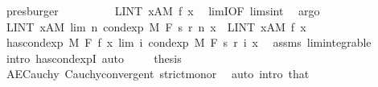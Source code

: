 \begin{isabellebody}
\ presburger\isanewline
\ \ \ \ \isamarkupfalse%
\ \isamarkupfalse%
\ {\isachardoublequoteopen}{\isachardot}{\kern0pt}{\isachardot}{\kern0pt}{\isachardot}{\kern0pt}\ {\isacharequal}{\kern0pt}\ LINT\ x{\isacharcolon}{\kern0pt}A{\isacharbar}{\kern0pt}M{\isachardot}{\kern0pt}\ f\ x{\isachardoublequoteclose}\ \isamarkupfalse%
\ limI{\isacharbrackleft}{\kern0pt}OF\ lim{\isacharunderscore}{\kern0pt}s{\isacharunderscore}{\kern0pt}int{\isacharbrackright}{\kern0pt}\ \isamarkupfalse%
\ argo\isanewline
\ \ \ \ \isamarkupfalse%
\ \isamarkupfalse%
\ {\isachardoublequoteopen}LINT\ x{\isacharcolon}{\kern0pt}A{\isacharbar}{\kern0pt}M{\isachardot}{\kern0pt}\ lim\ {\isacharparenleft}{\kern0pt}{\isasymlambda}n{\isachardot}{\kern0pt}\ cond{\isacharunderscore}{\kern0pt}exp\ M\ F\ {\isacharparenleft}{\kern0pt}s\ {\isacharparenleft}{\kern0pt}r\ n{\isacharparenright}{\kern0pt}{\isacharparenright}{\kern0pt}\ x{\isacharparenright}{\kern0pt}\ {\isacharequal}{\kern0pt}\ LINT\ x{\isacharcolon}{\kern0pt}A{\isacharbar}{\kern0pt}M{\isachardot}{\kern0pt}\ f\ x{\isachardoublequoteclose}\ \isacommand{{\isachardot}{\kern0pt}}\isamarkupfalse%
\isanewline
\ \ \isacommand{{\isacharbraceright}{\kern0pt}}\isamarkupfalse%
\isanewline
\ \ \isamarkupfalse%
\ {\isachardoublequoteopen}has{\isacharunderscore}{\kern0pt}cond{\isacharunderscore}{\kern0pt}exp\ M\ F\ f\ {\isacharparenleft}{\kern0pt}{\isasymlambda}x{\isachardot}{\kern0pt}\ lim\ {\isacharparenleft}{\kern0pt}{\isasymlambda}i{\isachardot}{\kern0pt}\ cond{\isacharunderscore}{\kern0pt}exp\ M\ F\ {\isacharparenleft}{\kern0pt}s\ {\isacharparenleft}{\kern0pt}r\ i{\isacharparenright}{\kern0pt}{\isacharparenright}{\kern0pt}\ x{\isacharparenright}{\kern0pt}{\isacharparenright}{\kern0pt}{\isachardoublequoteclose}\ \isamarkupfalse%
\ assms{\isacharparenleft}{\kern0pt}{}{\isacharparenright}{\kern0pt}\ lim{\isacharunderscore}{\kern0pt}integrable\ \isamarkupfalse%
\ {\isacharparenleft}{\kern0pt}intro\ has{\isacharunderscore}{\kern0pt}cond{\isacharunderscore}{\kern0pt}expI{\isacharprime}{\kern0pt}{\isacharcomma}{\kern0pt}\ auto{\isacharparenright}{\kern0pt}\ \isanewline
\ \ \isamarkupfalse%
\ thesis\ \isamarkupfalse%
\ AE{\isacharunderscore}{\kern0pt}Cauchy\ Cauchy{\isacharunderscore}{\kern0pt}convergent\ strict{\isacharunderscore}{\kern0pt}mono{\isacharunderscore}{\kern0pt}r\ \isamarkupfalse%
\ {\isacharparenleft}{\kern0pt}auto\ intro{\isacharbang}{\kern0pt}{\isacharcolon}{\kern0pt}\ that{\isacharparenright}{\kern0pt}\isanewline

\end{isabellebody}
